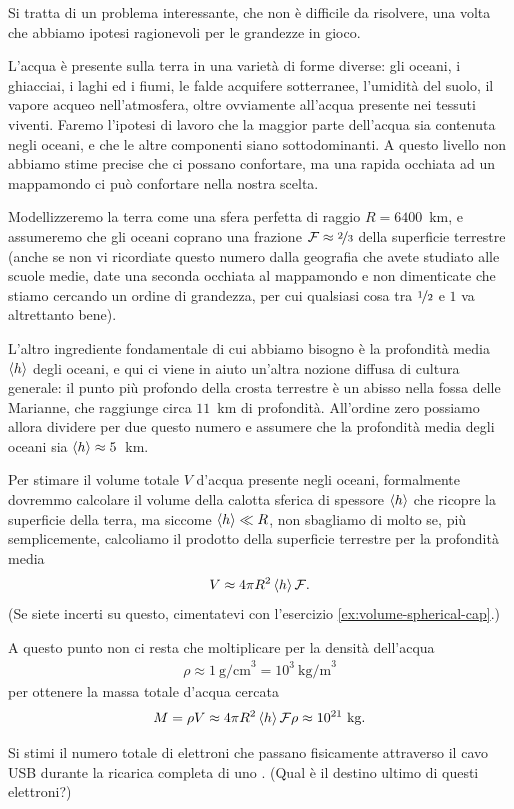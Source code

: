 \begin{solution}

Si tratta di un problema interessante, che non è difficile da risolvere, una volta
che abbiamo ipotesi ragionevoli per le grandezze in gioco.

L'acqua \`e presente sulla terra in una variet\`a di forme diverse: gli oceani, i ghiacciai,
i laghi ed i fiumi, le falde acquifere sotterranee, l'umidità del suolo, il vapore acqueo
nell'atmosfera, oltre ovviamente all'acqua presente nei tessuti viventi. Faremo l'ipotesi
di lavoro che la maggior parte dell'acqua sia contenuta negli oceani, e che le altre
componenti siano sottodominanti. A questo livello non abbiamo stime precise che ci possano
confortare, ma una rapida occhiata ad un mappamondo ci pu\`o confortare nella nostra scelta.

Modellizzeremo la terra come una sfera perfetta di raggio $R = 6400$~km, e assumeremo
che gli oceani coprano una frazione $\mathcal{F} \approx \nicefrac{2}{3}$ della superficie
terrestre (anche se non vi ricordiate questo numero dalla geografia che avete studiato alle
scuole medie, date una seconda occhiata al mappamondo e non dimenticate che stiamo cercando
un ordine di grandezza, per cui qualsiasi cosa tra $\nicefrac{1}{2}$ e $1$ va altrettanto
bene).

L'altro ingrediente fondamentale di cui abbiamo bisogno è la profondità media $\displaystyle \left<h\right>$
degli oceani, e qui ci viene in aiuto un'altra nozione diffusa di cultura generale:
il punto pi\`u profondo della crosta terrestre \`e un abisso nella fossa delle Marianne,
che raggiunge circa $11$~km di profondità. All'ordine zero possiamo allora dividere per
due questo numero e assumere che la profondità media degli oceani sia $\displaystyle \left<h\right> \approx 5$~km.

Per stimare il volume totale $V$ d'acqua presente negli oceani, formalmente dovremmo
calcolare il volume della calotta sferica di spessore $\displaystyle \left<h\right>$ che ricopre la
superficie della terra, ma siccome $\displaystyle \left<h\right> \ll R$, non sbagliamo di molto se, pi\`u
semplicemente, calcoliamo il prodotto della superficie terrestre per la profondit\`a
media
\begin{align*}
  V \approx 4 \pi R^2 \displaystyle \left<h\right> \mathcal{F}.
\end{align*}
(Se siete incerti su questo, cimentatevi con l'esercizio \ref{ex:volume-spherical-cap}.)

A questo punto non ci resta che moltiplicare per la densità dell'acqua
\begin{align*}
  \rho \approx 1~\text{g/cm}^3 = 10^3~\text{kg/m}^3
\end{align*}
per ottenere la massa totale d'acqua cercata
\begin{align*}
  M = \rho V \approx 4 \pi R^2 \displaystyle \left<h\right> \mathcal{F} \rho \approx 10^{21}~\text{kg}.
\end{align*}

\end{solution}



\begin{exercise}

Si stimi il numero totale di elettroni che passano fisicamente attraverso il cavo
USB durante la ricarica completa di uno . (Qual \`e il destino
ultimo di questi elettroni?)

\end{exercise}


\begin{solution}
\end{solution}
